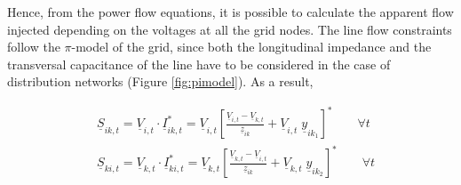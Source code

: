 %

\newpage
Hence, from the power flow equations, it is possible to calculate the apparent flow injected depending on the voltages at all the grid nodes. 
The line flow constraints follow the $\pi$-model of the grid, since both the longitudinal impedance and the transversal capacitance of the line have to be considered in the case of distribution networks (Figure \ref{fig:pimodel}). As a result,

\begin{subequations}
\begin{align*}
& \underline{S}_{ik,t} = \underline{V}_{i,t} \cdot \underline{I}_{ik,t}^{*} = \underline{V}_{i,t} \left[ \frac{\underline{V}_{i,t} - \underline{V}_{k,t}}{\underline{z}_{ik}} + \underline{V}_{i,t} \; \underline{y}_{ik_1} \right]^{*}   \qquad  \forall t  \\
& \underline{S}_{ki,t} = \underline{V}_{k,t} \cdot \underline{I}_{ki,t}^{*} = \underline{V}_{k,t} \left[ \frac{\underline{V}_{k,t} - \underline{V}_{i,t}}{\underline{z}_{ik}} + \underline{V}_{k,t} \;  \underline{y}_{ik_2} \right]^{*}   \qquad  \forall t  
\end{align*}
\end{subequations}


